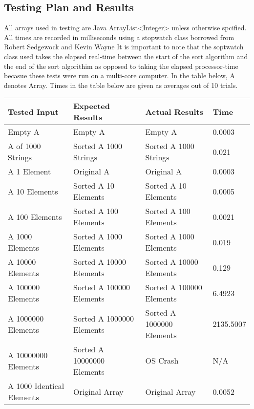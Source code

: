 \documentclass[onecolumn, 12pt, article]{IEEEtran}
\numberwithin{case}{problem}
\numberwithin{condition}{problem}
\numberwithin{condition}{subsection}
\numberwithin{definition}{section}
\theoremstyle{remark}
\numberwithin{question}{problem}
\theoremstyle{plain}
\numberwithin{answer}{problem}
\numberwithin{solution}{section}
\numberwithin{equation}{section}%
\begin{document}
\subsection{Testing Plan and Results}
All arrays used in testing are Java ArrayList<Integer> unless otherwise spcified. All times are recorded in milliseconds using a stopwatch class borrowed from Robert Sedgewock and Kevin Wayne %
It is important to note that the soptwatch class used takes the elapsed real-time between the start of the sort algorithm and the end of the sort algorithim as opposed to taking the elapsed processor-time becasue these tests were run on a multi-core computer.
In the table below, A denotes Array. Times in the table below are given as averages out of 10 trials.
\newline
{}
\begin{center}
\begin{tabular}{|l|l|l|l|}
\hline Tested Input & Expected Results & Actual Results & Time \\
\hline Empty A & Empty A & Empty A & 0.0003 \\
\hline A of 1000 Strings & Sorted A 1000 Strings & Sorted A 1000 Strings & 0.021 \\
\hline A 1 Element & Original A & Original A & 0.0003 \\
\hline A 10 Elements & Sorted A 10 Elements & Sorted A 10 Elements & 0.0005 \\
\hline A 100 Elements & Sorted A 100 Elements & Sorted A 100 Elements & 0.0021 \\
\hline A 1000 Elements & Sorted A 1000 Elements & Sorted A 1000 Elements & 0.019 \\
\hline A 10000 Elements & Sorted A 10000 Elements & Sorted A 10000 Elements & 0.129 \\
\hline A 100000 Elements & Sorted A 100000 Elements & Sorted A 100000 Elements & 6.4923 \\
\hline A 1000000 Elements & Sorted A 1000000 Elements & Sorted A 1000000 Elements & 2135.5007 \\
\hline A 10000000 Elements & Sorted A 10000000 Elements & OS Crash & N/A \\
\hline A 1000 Identical Elements & Original Array & Original Array & 0.0052 \\
\hline
\end{tabular}
\end{center}
\newline
{}
\end{document}
